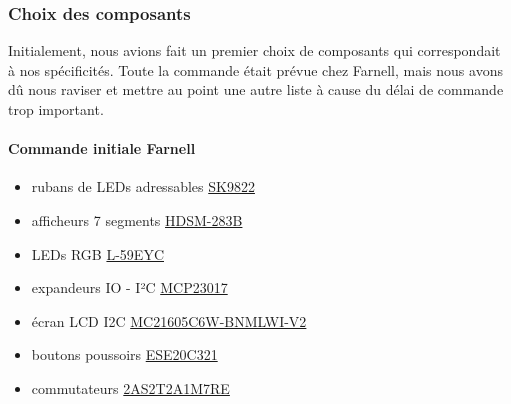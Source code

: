 \documentclass[12pt]{report}
\begin{document}
	\subsubsection{Choix des composants}
	Initialement, nous avions fait un premier choix de composants qui correspondait à nos spécificités. Toute la commande était prévue chez Farnell, mais nous avons dû nous raviser et mettre au point une autre liste à cause du délai de commande trop important.\\
	\paragraph{Commande initiale Farnell}
	\begin{itemize}[label=$-$]
		\item rubans de LEDs adressables \href{https://fr.aliexpress.com/item/1005006918408592.html?spm=a2g0o.productlist.main.19.fbb0788296kxRo&algo_pvid=72d2c9a9-ec47-4e4b-9d14-7e90be35485c&algo_exp_id=72d2c9a9-ec47-4e4b-9d14-7e90be35485c-9&pdp_npi=4%40dis!EUR!18.92!18.92!!!145.68!145.68!%402103888a17169934968957029e0b2f!12000038723750387!sea!FR!0!AB&curPageLogUid=lAauznpLAY1Y&utparam-url=scene%3Asearch%7Cquery_from%3A}{SK9822}\\
		\item afficheurs 7 segments \href{https://fr.farnell.com/broadcom-limited/hdsm-283b/afficheur-a-led-cms-7mm-bleu-cc/dp/1659312}{HDSM-283B}\\
		\item LEDs RGB \href{https://fr.farnell.com/kingbright/l-59eyc/led-5mm-tricolore/dp/1168662}{L-59EYC}\\
		\item expandeurs IO - I²C \href{https://fr.farnell.com/microchip/mcp23017-e-sp/16-bit-expander-i-o-i2c-i-f/dp/1332088}{MCP23017}\\
		\item écran LCD I2C \href{https://fr.farnell.com/midas/mc21605c6w-bnmlwi-v2/afficheur-alphanumerique-16x2/dp/2748649}{MC21605C6W-BNMLWI-V2}\\
		\item boutons poussoirs \href{https://fr.farnell.com/panasonic/ese20c321/commutateur-bouton-pouss-momentane/dp/2079613}{ESE20C321}\\
		\item commutateurs \href{https://fr.farnell.com/multicomp/2as2t2a1m7re/switch-toggle-spdt-on-mom/dp/1550118}{2AS2T2A1M7RE}\\
	\end{itemize}
\end{document}
